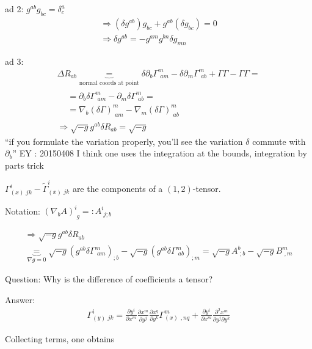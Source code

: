 ad 2: $g^{ab}g_{bc} = \delta^a_c$
\[
\begin{gathered}
\Longrightarrow (\delta g^{ab})g_{bc} + g^{ab}(\delta g_{bc}) = 0  \\
 \Longrightarrow \delta g^{ab} = -g^{am} g^{bn} \delta g_{mn}
\end{gathered}
\]

ad 3: 
\[
\begin{gathered}
  \Delta R_{ab} \underbrace{=}_{\text{normal coords at point}} \delta \partial_b \Gamma^m_{ \, \, am} - \delta \partial_m \Gamma^m_{ \, \, ab} + \Gamma \Gamma - \Gamma \Gamma = \\
  \begin{aligned}
    & = \partial_b \delta \Gamma^m_{ \, \, am} - \partial_m \delta \Gamma^m_{ \, \, ab } = \\  
    & = \nabla_b (\delta \Gamma)^m_{ \, \, am} - \nabla_m (\delta \Gamma)^m_{ \, \, ab}
\end{aligned} \\
\Longrightarrow \sqrt{-g} g^{ab} \delta R_{ab} = \sqrt{-g}
\end{gathered}
\]
``if you formulate the variation properly, you'll see the variation $\delta$ commute with $\partial _b$'' EY : 20150408 I think one uses the integration at the bounds, integration by parts trick

$\Gamma^i_{(x) \, \, jk } - \widetilde{\Gamma}^i_{ (x) \, \, jk }$ are the components of a $(1,2)$-tensor.

Notation: $(\nabla_b A)^i_{ \, \, g} =: A^i_{ \, \, j;b}$

\[
\begin{gathered}
\Longrightarrow \sqrt{-g} g^{ab} \delta R_{ab}  \\
\underbrace{=}_{ \nabla g = 0 } \sqrt{-g} (g^{ab} \delta \Gamma^m_{ \, \, am} )_{;b} - \sqrt{-g} (g^{ab} \delta \Gamma^m_{ \, \, ab} )_{ ; m} = \sqrt{-g} A^b_{ \, \, ; b} - \sqrt{-g} B^m_{ \, \, , m }
\end{gathered}
\]

Question: Why is the difference of coefficients a tensor?

Answer:
\[
\begin{aligned}
\Gamma_{(y) \, \, jk}^i = \frac{ \partial y^i}{ \partial x^m} \frac{ \partial x^m}{ \partial y^j} \frac{ \partial x^q}{ \partial y^k} \Gamma^m_{(x) \,\ , nq} + \frac{ \partial y^i}{ \partial x^m} \frac{ \partial^2 x^m}{ \partial y^j \partial y^k}
\end{aligned}
\]

Collecting terms, one obtains

